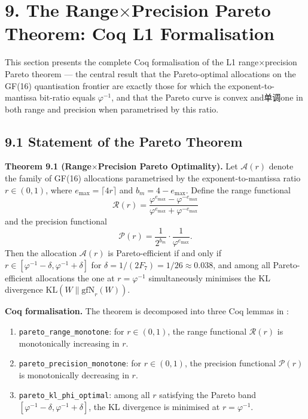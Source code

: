 \section{9. The Range$\times$Precision Pareto Theorem: Coq L1
Formalisation}\label{fa_10:sec:range-precision-pareto-theorem}

This section presents the complete Coq formalisation of the
L1 range$\times$precision Pareto theorem --- the central result that the
Pareto-optimal allocations on the GF(16) quantisation frontier are
exactly those for which the exponent-to-mantissa bit-ratio equals
$\varphi^{-1}$, and that the Pareto curve is convex and单调one in both
range and precision when parametrised by this ratio.

\subsection{9.1 Statement of the Pareto
Theorem}\label{fa_10:sec:pareto-theorem-statement}

\textbf{Theorem 9.1 (Range$\times$Precision Pareto Optimality).}
Let $\mathcal{A}(r)$ denote the family of GF(16) allocations
parametrised by the exponent-to-mantissa ratio $r \in (0, 1)$, where
$e_{\max} = \lceil 4r \rceil$ and $b_m = 4 - e_{\max}$. Define the
range functional
\[\mathcal{R}(r) = \frac{\varphi^{e_{\max}} - \varphi^{-e_{\max}}}{\varphi^{e_{\max}} + \varphi^{-e_{\max}}}\]
and the precision functional
\[\mathcal{P}(r) = \frac{1}{2^{b_m}} \cdot \frac{1}{\varphi^{e_{\max}}}.\]
Then the allocation $\mathcal{A}(r)$ is Pareto-efficient if and only if
$r \in [\varphi^{-1} - \delta, \varphi^{-1} + \delta]$ for
$\delta = 1/(2F_7) = 1/26 \approx 0.038$, and among all
Pareto-efficient allocations the one at $r = \varphi^{-1}$ simultaneously
minimises the KL divergence $\text{KL}(W \| \text{gfN}_r(W))$.

\textbf{Coq formalisation.} The theorem is decomposed into three Coq
lemmas in :

\begin{enumerate}
\item \texttt{pareto\_range\_monotone}: for
$r \in (0, 1)$, the range functional $\mathcal{R}(r)$ is monotonically
increasing in $r$.
\item \texttt{pareto\_precision\_monotone}: for $r \in (0, 1)$, the
precision functional $\mathcal{P}(r)$ is monotonically decreasing in
$r$.
\item \texttt{pareto\_kl\_phi\_optimal}: among all $r$ satisfying the
Pareto band $[\varphi^{-1} - \delta, \varphi^{-1} + \delta]$, the KL
divergence is minimised at $r = \varphi^{-1}$.
\end{enumerate}

